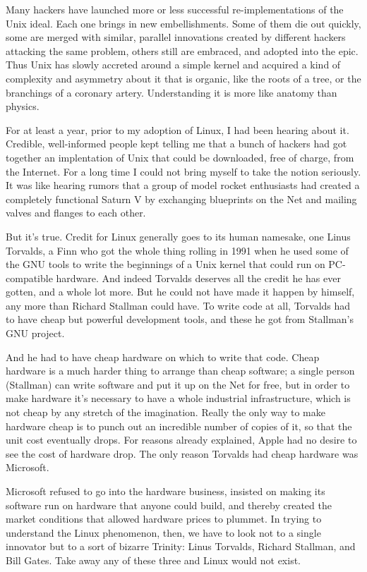 \documentclass[
  fontsize=11pt,
  paper=landscape,
  twocolumn=true,
  pagesize=pdftex,
  headings=small,
  DIV=15,
  ]{scrartcl}
\begin{document}
Many hackers have launched more or less successful re-implementations of
the Unix ideal. Each one brings in new embellishments. Some of them die
out quickly, some are merged with similar, parallel innovations created
by different hackers attacking the same problem, others still are
embraced, and adopted into the epic. Thus Unix has slowly accreted
around a simple kernel and acquired a kind of complexity and asymmetry
about it that is organic, like the roots of a tree, or the branchings of
a coronary artery. Understanding it is more like anatomy than physics.

For at least a year, prior to my adoption of Linux, I had been hearing
about it. Credible, well-informed people kept telling me that a bunch of
hackers had got together an implentation of Unix that could be
downloaded, free of charge, from the Internet. For a long time I could
not bring myself to take the notion seriously. It was like hearing
rumors that a group of model rocket enthusiasts had created a completely
functional Saturn V by exchanging blueprints on the Net and mailing
valves and flanges to each other.

But it's true. Credit for Linux generally goes to its human namesake,
one Linus Torvalds, a Finn who got the whole thing rolling in 1991 when
he used some of the GNU tools to write the beginnings of a Unix kernel
that could run on PC-compatible hardware. And indeed Torvalds deserves
all the credit he has ever gotten, and a whole lot more. But he could
not have made it happen by himself, any more than Richard Stallman could
have. To write code at all, Torvalds had to have cheap but powerful
development tools, and these he got from Stallman's GNU project.

And he had to have cheap hardware on which to write that code. Cheap
hardware is a much harder thing to arrange than cheap software; a single
person (Stallman) can write software and put it up on the Net for free,
but in order to make hardware it's necessary to have a whole industrial
infrastructure, which is not cheap by any stretch of the imagination.
Really the only way to make hardware cheap is to punch out an incredible
number of copies of it, so that the unit cost eventually drops. For
reasons already explained, Apple had no desire to see the cost of
hardware drop. The only reason Torvalds had cheap hardware was
Microsoft.

Microsoft refused to go into the hardware business, insisted on making
its software run on hardware that anyone could build, and thereby
created the market conditions that allowed hardware prices to plummet.
In trying to understand the Linux phenomenon, then, we have to look not
to a single innovator but to a sort of bizarre Trinity: Linus Torvalds,
Richard Stallman, and Bill Gates. Take away any of these three and Linux
would not exist.
\end{document}
